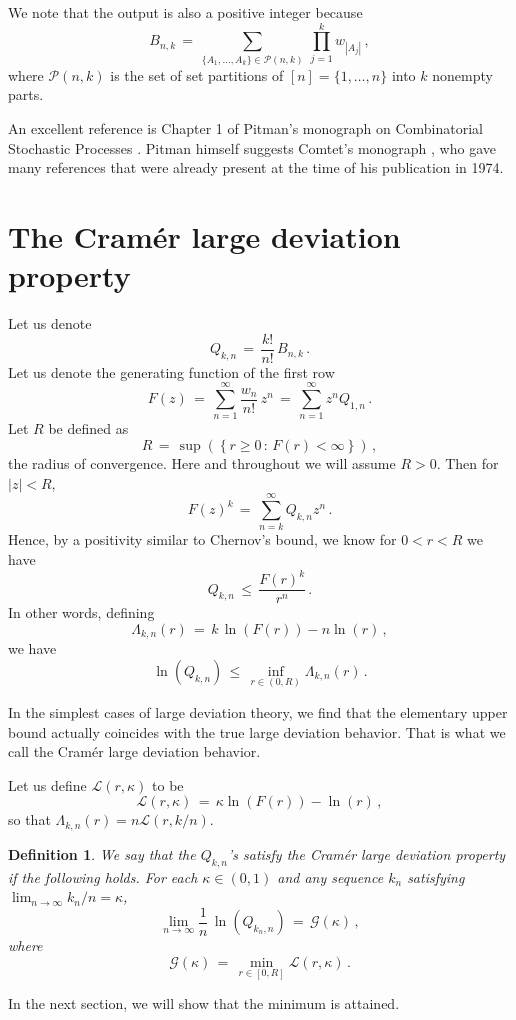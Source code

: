 \documentclass[12pt]{article}
\newtheorem{definition}[thm]{Definition}
\begin{document}
We note that the output is also a positive integer  because
$$
B_{n,k}\, =\, \sum_{\{A_1,\dots,A_k\} \in \mathcal{P}(n,k)}\, \prod_{j=1}^{k} w_{|A_j|}\, ,
$$
where $\mathcal{P}(n,k)$ is the set of set partitions of $[n] = \{1,\dots,n\}$ into $k$
nonempty parts.

An excellent reference is Chapter 1 of Pitman's monograph on Combinatorial Stochastic Processes
\cite{Pitman}.
Pitman himself suggests Comtet's monograph \cite{Comtet}, who gave many references that were already present at
the time of his publication in 1974.
\section{The Cram\'er large deviation property}

Let us denote
$$
Q_{k,n}\, =\, \frac{k!}{n!}\,  B_{n,k}\, .
$$
Let us denote the generating function of the first row
$$
F(z)\, =\, \sum_{n=1}^{\infty} \frac{w_n}{n!}\, z^n\, =\, \sum_{n=1}^{\infty}  z^n Q_{1,n}\, .
$$
Let $R$ be defined as
$$
R\, =\, \sup\left(\left\{r\geq 0\, :\, F(r)<\infty\right\}\right)\, ,
$$
the radius of convergence.
Here and throughout we will assume $R>0$.
Then for $|z|<R$,
$$
F(z)^k\, =\, \sum_{n=k}^\infty Q_{k,n} z^n\, .
$$
Hence, by a positivity similar to Chernov's bound, we know for $0<r<R$ we have
$$
Q_{k,n}\, \leq\, \frac{F(r)^k}{r^n}\, .
$$
In other words,
defining
$$
\Lambda_{k,n}(r)\, =\, k\, \ln(F(r)) - n \ln(r)\, ,
$$
we have
\begin{equation}
\label{ineq:Upper}
\ln\left(Q_{k,n}\right)\, \leq\, \inf_{r \in (0,R)} \Lambda_{k,n}(r)\, .
\end{equation}


In the simplest cases of large deviation theory, we find that the elementary upper
bound actually coincides with the true large deviation behavior.
That is what we call the Cram\'er large deviation behavior.

Let us define $\mathcal{L}(r,\kappa)$ to be
$$
\mathcal{L}(r,\kappa)\, =\, \kappa \ln(F(r)) - \ln(r)\, ,
$$
so that $\Lambda_{k,n}(r) = n \mathcal{L}(r,k/n)$.

\begin{definition}
\label{def:MainOne}
We say that the $Q_{k,n}$'s satisfy the Cram\'er large deviation property if the following holds.
For each $\kappa \in (0,1)$ and any sequence $k_n$ satisfying $\lim_{n \to \infty} k_n/n = \kappa$,
$$
\lim_{n \to \infty} \frac{1}{n}\, \ln\left(Q_{k_n,n}\right)\,
=\, \mathcal{G}(\kappa)\, ,
$$
where
$$
\mathcal{G}(\kappa)\, =\, \min_{r \in [0,R]} \mathcal{L}(r,\kappa)\, .
$$
\end{definition}
In the next section, we will show that the minimum is attained.
\end{document}
